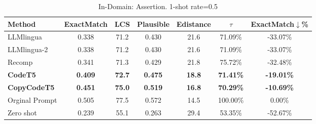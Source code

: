 \begin{table}[!htbp]
\caption{In-Domain: Assertion. 1-shot rate=0.5}
\begin{tabular}{l|cccccc}
\hline
Method              & ExactMatch     & LCS           & Plausible      & Edistance     & $\tau$   & ExactMatch$\downarrow$\%   \\ \hline
LLMlingua           & 0.338          & 71.2          & 0.430          & 21.6          & 71.09\%          & -33.07\%          \\
LLMlingua-2           & 0.338          & 71.2          & 0.430          & 21.6          & 71.09\%          & -33.07\%          \\
Recomp       & 0.341          & 71.3          & 0.429          & 21.8          & 75.72\%          & -32.48\%          \\
\textbf{CodeT5}     & \textbf{0.409} & \textbf{72.7} & \textbf{0.475} & \textbf{18.8} & \textbf{71.41\%} & \textbf{-19.01\%} \\
\textbf{CopyCodeT5} & \textbf{0.451} & \textbf{75.0} & \textbf{0.519} & \textbf{16.8} & \textbf{70.29\%} & \textbf{-10.69\%} \\ \hline
Orginal Prompt      & 0.505          & 77.5          & 0.572          & 14.5          & 100.00\%         & 0.00\%            \\
Zero shot           & 0.239          & 55.1          & 0.263          & 29.4          & 53.35\%          & -52.67\%          \\ \hline
\end{tabular}
\end{table}

